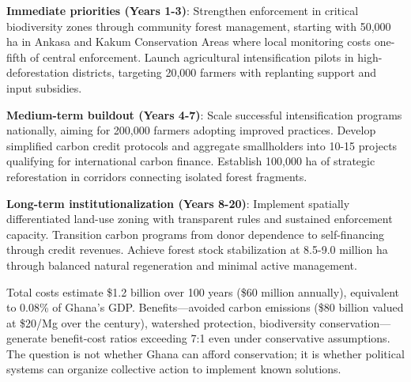 \textbf{Immediate priorities (Years 1-3)}: Strengthen enforcement in critical biodiversity zones through community forest management, starting with 50,000 ha in Ankasa and Kakum Conservation Areas where local monitoring costs one-fifth of central enforcement. Launch agricultural intensification pilots in high-deforestation districts, targeting 20,000 farmers with replanting support and input subsidies.

\textbf{Medium-term buildout (Years 4-7)}: Scale successful intensification programs nationally, aiming for 200,000 farmers adopting improved practices. Develop simplified carbon credit protocols and aggregate smallholders into 10-15 projects qualifying for international carbon finance. Establish 100,000 ha of strategic reforestation in corridors connecting isolated forest fragments.

\textbf{Long-term institutionalization (Years 8-20)}: Implement spatially differentiated land-use zoning with transparent rules and sustained enforcement capacity. Transition carbon programs from donor dependence to self-financing through credit revenues. Achieve forest stock stabilization at 8.5-9.0 million ha through balanced natural regeneration and minimal active management.

Total costs estimate \$1.2 billion over 100 years (\$60 million annually), equivalent to 0.08\% of Ghana's GDP. Benefits—avoided carbon emissions (\$80 billion valued at \$20/Mg over the century), watershed protection, biodiversity conservation—generate benefit-cost ratios exceeding 7:1 even under conservative assumptions. The question is not whether Ghana can afford conservation; it is whether political systems can organize collective action to implement known solutions.
